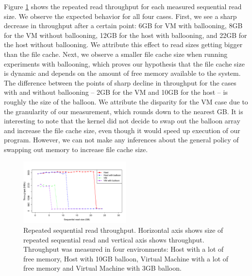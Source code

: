 Figure \ref{fig:p3graph} shows the repeated read throughput for each measured sequential read size. We observe the expected behavior for all four cases. First, we see a sharp decrease in throughput after a certain point: 6GB for VM with ballooning, 8GB for the VM without ballooning, 12GB for the host with ballooning, and 22GB for the host without ballooning. We attribute this effect to read sizes getting bigger than the file cache. Next, we observe a smaller file cache size when running experiments with ballooning, which proves our hypothesis that the file cache size is dynamic and depends on the amount of free memory available to the system. The difference between the points of sharp decline in throughput for the cases with and without ballooning -- 2GB for the VM and 10GB for the host -- is roughly the size of the balloon. We attribute the disparity for the VM case due to the granularity of our measurement, which rounds down to the nearest GB. It is interesting to note that the kernel did not decide to swap out the balloon array and increase the file cache size, even though it would speed up execution of our program. However, we can not make any inferences about the general policy of swapping out memory to increase file cache size. 

\begin{figure}[t!]
	\includegraphics[width=0.5\textwidth]{./figures/p3.pdf}
	\caption{Repeated sequential read throughput. Horizontal axis shows size of repeated sequential read and vertical axis shows throughput. Throughput was measured in four environments: Host with a lot of free memory, Host with 10GB balloon, Virtual Machine with a lot of free memory and Virtual Machine with 3GB balloon.}
	\label{fig:p3graph}
\end{figure}
